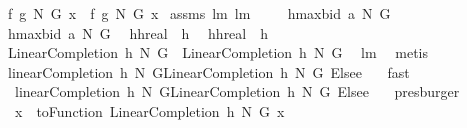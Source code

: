 \begin{isabellebody}
{\isacharparenleft}\ {\isachardoublequoteopen}{\isacharquery}f{}\ {\isacharquery}g{}\ N\ G\ x\ {\isacharequal}\ {\isacharquery}f{}\ {\isacharquery}g{}\ N\ G\ x{\isachardoublequoteclose}{\isacharparenright}\isanewline
%
\isadelimproof
%
\endisadelimproof
%
\isatagproof
{}\isamarkupfalse%
\ assms\ lm{}{}\ lm{}{}\ \ \isanewline
{}\isamarkupfalse%
\ {\isacharminus}\isanewline
{}\isamarkupfalse%
\ {\isacharquery}h{}{\isacharequal}{\isachardoublequoteopen}maxbid{\isacharprime}\ a\ N\ G{\isachardoublequoteclose}\ \isamarkupfalse%
\ {\isacharquery}h{}{\isacharequal}{\isachardoublequoteopen}maxbid\ a\ N\ G{\isachardoublequoteclose}\ \isamarkupfalse%
\ {\isacharquery}hh{}{\isacharequal}{\isachardoublequoteopen}real\ {\isasymcirc}\ {\isacharquery}h{}{\isachardoublequoteclose}\ \isamarkupfalse%
\ {\isacharquery}hh{}{\isacharequal}{\isachardoublequoteopen}real\ {\isasymcirc}\ {\isacharquery}h{}{\isachardoublequoteclose}\isanewline
{}\isamarkupfalse%
\ {\isachardoublequoteopen}LinearCompletion\ {\isacharquery}h{}\ N\ G\ {\isacharequal}\ LinearCompletion\ {\isacharquery}h{}\ N\ G{\isachardoublequoteclose}\ \isamarkupfalse%
\ lm{}{}\ \isamarkupfalse%
\ metis\ \isanewline
{}\isamarkupfalse%
\ \isamarkupfalse%
\ {\isachardoublequoteopen}linearCompletion\ {\isacharquery}h{}\ N\ G{\isacharequal}{\isacharparenleft}LinearCompletion\ {\isacharquery}h{}\ N\ G{\isacharparenright}\ Elsee\ {}{\isachardoublequoteclose}\ \isamarkupfalse%
\ fast\isanewline
{}\isamarkupfalse%
\ \isamarkupfalse%
\ {\isachardoublequoteopen}\ linearCompletion\ {\isacharquery}h{}\ N\ G{\isacharequal}LinearCompletion\ {\isacharquery}h{}\ N\ G\ Elsee\ {}{\isachardoublequoteclose}\ \isamarkupfalse%
\ presburger\isanewline
{}\isamarkupfalse%
\ \isamarkupfalse%
\ {\isachardoublequoteopen}{\isachardot}{\isachardot}{\isachardot}\ x\ {\isacharequal}\ {\isacharparenleft}toFunction\ {\isacharparenleft}LinearCompletion\ {\isacharquery}h{}\ N\ G{\isacharparenright}{\isacharparenright}\ x{\isachardoublequoteclose}\ \isamarkupfalse%

\end{isabellebody}
